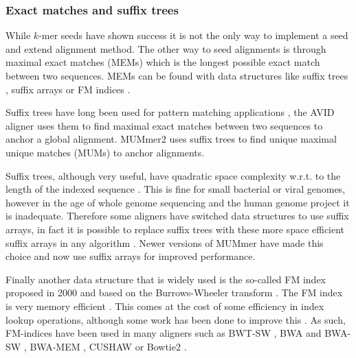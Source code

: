 \documentclass[
  11pt,
  twoside,
  BCOR=10mm,
  listof=totoc]{scrbook}
\begin{document}
\hypertarget{exact-matches-and-suffix-trees}{%
\subsubsection{Exact matches and suffix trees}\label{exact-matches-and-suffix-trees}}

While \(k\)-mer seeds have shown success it is not the only way to implement a seed and extend alignment method. The other way to seed alignments is through maximal exact matches (MEMs) which is the longest possible exact match between two sequences. MEMs can be found with data structures like suffix trees \autocite{weinerLinearPatternMatching1973}, suffix arrays \autocite{manberSuffixArraysNew1993,abouelhodaEnhancedSuffixArray2002} or FM indices \autocite{ferraginaOpportunisticDataStructures2000}.

Suffix trees have long been used for pattern matching applications \autocite{gusfieldAlgorithmsStringsTrees1997}, the AVID aligner \autocite{brayAVIDGlobalAlignment2003} uses them to find maximal exact matches between two sequences to anchor a global alignment. MUMmer2 \autocite{delcherFastAlgorithmsLargescale2002} uses suffix trees to find unique maximal unique matches (MUMs) to anchor alignments.

Suffix trees, although very useful, have quadratic space complexity w.r.t. to the length of the indexed sequence \autocite{gusfieldAlgorithmsStringsTrees1997}. This is fine for small bacterial or viral genomes, however in the age of whole genome sequencing and the human genome project it is inadequate. Therefore some aligners have switched data structures to use suffix arrays, in fact it is possible to replace suffix trees with these more space efficient suffix arrays in any algorithm \autocite{abouelhodaReplacingSuffixTrees2004}. Newer versions of MUMmer \autocite{marcaisMUMmer4FastVersatile2018} have made this choice and now use suffix arrays for improved performance.

Finally another data structure that is widely used is the so-called FM index proposed in 2000 \autocite{ferraginaOpportunisticDataStructures2000} and based on the Burrows-Wheeler transform \autocite{burrowsBlockSortingLosslessData1994}. The FM index is very memory efficient \autocite{vyvermanProspectsLimitationsFulltext2012}. This comes at the cost of some efficiency in index lookup operations, although some work has been done to improve this \autocite{chengFMtreeFastLocating2018}. As such, FM-indices have been used in many aligners such as BWT-SW \autocite{lamCompressedIndexingLocal2008}, BWA \autocite{liFastAccurateShort2009} and BWA-SW \autocite{liFastAccurateLongread2010}, BWA-MEM \autocite{liAligningSequenceReads2013}, CUSHAW \autocite{liuLongReadAlignment2012} or Bowtie2 \autocite{langmeadFastGappedreadAlignment2012}.
\end{document}
